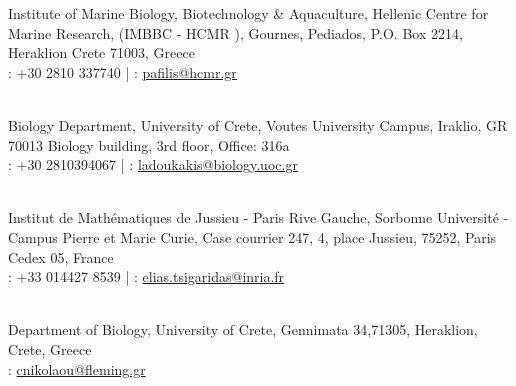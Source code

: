 \documentclass[
	a4paper,
]{fortysecondscv}
\begin{document}
\begin{cvtable}

	    {Institute of Marine Biology, Biotechnology \& Aquaculture, Hellenic Centre for Marine Research, (IMBBC - HCMR
	    ),
	    Gournes, Pediados, P.O. Box 2214, Heraklion Crete 71003, Greece \\ \faPhone: +30 2810 337740 | 
	    \faAt: \href{mailto:pafilis@hcmr.gr}{pafilis@hcmr.gr}}
	    
	\\
	  
	    {Biology Department, University of Crete,
	    Voutes University Campus, Iraklio, GR 70013 Biology building, 3rd floor, Office: 316a 
	    \\ 
	    \faPhone: +30 2810394067 | 
	    \faAt: \href{mailto:ladoukakis@biology.uoc.gr}{ladoukakis@biology.uoc.gr}}
	  
	\\ 

    
	    {Institut de Mathématiques de Jussieu - Paris Rive Gauche, Sorbonne Université - Campus Pierre et Marie Curie, Case courrier 247, 4, place Jussieu, 75252, Paris Cedex 05, France \\ 
	    \faPhone: +33 014427 8539 | \faAt: \href{mailto: elias.tsigaridas@inria.fr}{elias.tsigaridas@inria.fr}}

    \\

	    {Department of Biology, University of Crete, Gennimata 34,71305, Heraklion, Crete, Greece \\ 
	    \faAt: \href{mailto:cnikolaou@fleming.gr}{cnikolaou@fleming.gr}}


\end{cvtable}





\end{document}
